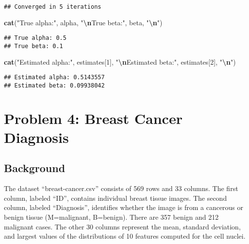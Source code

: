 \documentclass[
]{article}
\newenvironment{Shaded}{\begin{snugshade}}{\end{snugshade}}
\newcommand{\DecValTok}[1]{\textcolor[rgb]{0.00,0.00,0.81}{#1}}
\newcommand{\FunctionTok}[1]{\textcolor[rgb]{0.13,0.29,0.53}{\textbf{#1}}}
\newcommand{\NormalTok}[1]{#1}
\newcommand{\SpecialCharTok}[1]{\textcolor[rgb]{0.81,0.36,0.00}{\textbf{#1}}}
\newcommand{\StringTok}[1]{\textcolor[rgb]{0.31,0.60,0.02}{#1}}
\begin{document}
\begin{verbatim}
## Converged in 5 iterations
\end{verbatim}

\begin{Shaded}
\begin{Highlighting}[]
\FunctionTok{cat}\NormalTok{(}\StringTok{"True alpha:"}\NormalTok{, alpha, }\StringTok{"}\SpecialCharTok{\textbackslash{}n}\StringTok{True beta:"}\NormalTok{, beta, }\StringTok{"}\SpecialCharTok{\textbackslash{}n}\StringTok{"}\NormalTok{)}
\end{Highlighting}
\end{Shaded}

\begin{verbatim}
## True alpha: 0.5 
## True beta: 0.1
\end{verbatim}

\begin{Shaded}
\begin{Highlighting}[]
\FunctionTok{cat}\NormalTok{(}\StringTok{"Estimated alpha:"}\NormalTok{, estimates[}\DecValTok{1}\NormalTok{], }\StringTok{"}\SpecialCharTok{\textbackslash{}n}\StringTok{Estimated beta:"}\NormalTok{, estimates[}\DecValTok{2}\NormalTok{], }\StringTok{"}\SpecialCharTok{\textbackslash{}n}\StringTok{"}\NormalTok{)}
\end{Highlighting}
\end{Shaded}

\begin{verbatim}
## Estimated alpha: 0.5143557 
## Estimated beta: 0.09938042
\end{verbatim}

\hypertarget{problem-4-breast-cancer-diagnosis}{%
\section{Problem 4: Breast Cancer
Diagnosis}\label{problem-4-breast-cancer-diagnosis}}

\hypertarget{background}{%
\subsection{Background}\label{background}}

The dataset ``breast-cancer.csv'' consists of 569 rows and 33 columns.
The first column, labeled ``ID'', contains individual breast tissue
images. The second column, labeled ``Diagnosis'', identifies whether the
image is from a cancerous or benign tissue (M=malignant, B=benign).
There are 357 benign and 212 malignant cases. The other 30 columns
represent the mean, standard deviation, and largest values of the
distributions of 10 features computed for the cell nuclei.
\end{document}
